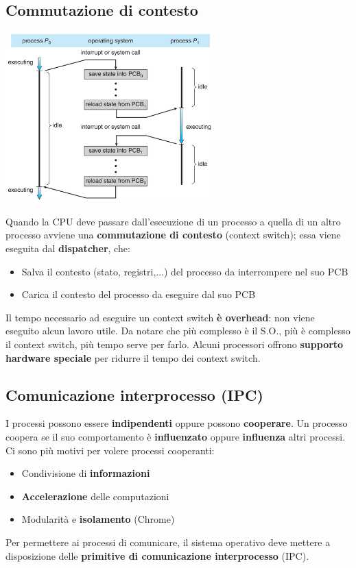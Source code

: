 \documentclass[12pt]{article}
\begin{document}
\subsection{Commutazione di contesto}
\begin{center}
    \includegraphics[width = 0.60\textwidth]{Images/57.PNG}
\end{center}
Quando la CPU deve passare dall'esecuzione di un processo a quella di un altro processo avviene una \textbf{commutazione di contesto} (context switch); essa viene eseguita dal \textbf{dispatcher}, che:
\begin{itemize}
    \item Salva il contesto (stato, registri,...) del processo da interrompere nel suo PCB
    \item Carica il contesto del processo da eseguire dal suo PCB
\end{itemize}
Il tempo necessario ad eseguire un context switch \textbf{è overhead}: non viene eseguito alcun lavoro utile. Da notare che più complesso è il S.O., più è complesso il context switch, più tempo serve per farlo. Alcuni processori offrono \textbf{supporto hardware speciale} per ridurre il tempo dei context switch.
\subsection{Comunicazione interprocesso (IPC)}
I processi possono essere \textbf{indipendenti} oppure possono \textbf{cooperare}. Un processo coopera se il suo comportamento è \textbf{influenzato} oppure \textbf{influenza} altri processi. Ci sono più motivi per volere processi cooperanti:
\begin{itemize}
    \item Condivisione di \textbf{informazioni}
    \item \textbf{Accelerazione} delle computazioni
    \item Modularità e \textbf{isolamento} (Chrome)
\end{itemize}
Per permettere ai processi di comunicare, il sistema operativo deve mettere a disposizione delle \textbf{primitive di comunicazione interprocesso} (IPC).
\end{document}
